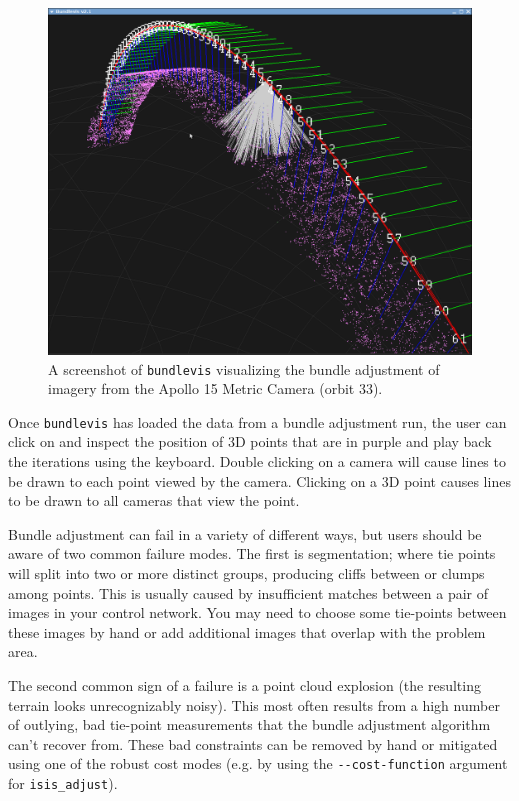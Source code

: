 \begin{figure}[b!]
  \begin{center}
  \includegraphics[width=5in]{images/bundlevis_apollo.png}
  \end{center}
  \caption{ A screenshot of \texttt{bundlevis} visualizing the bundle
    adjustment of imagery from the Apollo 15 Metric Camera (orbit
    33). }
  \label{fig:bundlevis}
\end{figure}

Once \texttt{bundlevis} has loaded the data from a bundle adjustment run,
the user can click on and inspect the position of 3D points that are
in purple and play back the iterations using the keyboard. Double
clicking on a camera will cause lines to be drawn to each point viewed
by the camera. Clicking on a 3D point causes lines to be drawn to all
cameras that view the point.

Bundle adjustment can fail in a variety of different ways, but users
should be aware of two common failure modes.  The first is segmentation;
where tie points will split into two or more distinct groups,
producing cliffs between or clumps among points. This is usually
caused by insufficient matches between a pair of images in your
control network.  You may need to choose some tie-points between
these images by hand or add additional images that overlap with the
problem area.

The second common sign of a failure is a point cloud explosion (the
resulting terrain looks unrecognizably noisy). This most often results
from a high number of outlying, bad tie-point measurements that the
bundle adjustment algorithm can't recover from. These bad constraints
can be removed by hand or mitigated using one of the robust cost modes
(e.g. by using the \texttt{-\/-cost-function} argument for
\texttt{isis\_adjust}).

